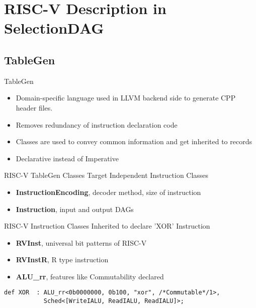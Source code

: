 \section{RISC-V Description in SelectionDAG}
\subsection{TableGen}
\begin{frame}{TableGen}
    \begin{itemize}
        \item Domain-specific language used in LLVM backend side to generate CPP header files.
        \item
        Removes redundancy of instruction declaration code
        \item
        Classes are used to convey common information and get inherited to records
        \item
        Declarative instead of Imperative
    \end{itemize}
\end{frame}

\begin{frame}[fragile]{RISC-V TableGen Classes}
Target Independent Instruction Classes
    \begin{itemize}
        \item \textbf{InstructionEncoding}, decoder method, size of instruction
        \item
        \textbf{Instruction}, input and output DAGs
    \end{itemize}
RISC-V Instruction Classes Inherited to declare 'XOR' Instruction
    \begin{itemize}
        \item \textbf{RVInst}, universal bit patterns of RISC-V
        \item
        \textbf{RVInstR}, R type instruction
        \item
        \textbf{ALU\_rr}, features like Commutability declared
    \end{itemize}
\begin{lstlisting}
def XOR  : ALU_rr<0b0000000, 0b100, "xor", /*Commutable*/1>,
           Sched<[WriteIALU, ReadIALU, ReadIALU]>;
\end{lstlisting}
\end{frame}
